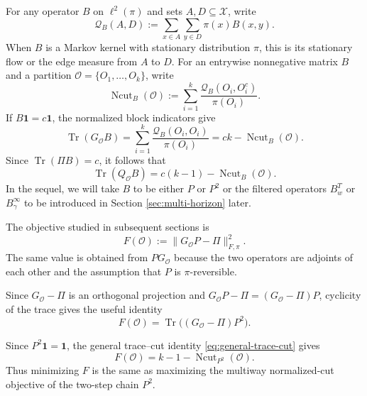 \documentclass[11pt]{article}
\newcommand{\1}{\mathbf{1}}
\newcommand{\X}{\mathcal{X}}
\begin{document}
For any operator $B$ on $\ell^2(\pi)$ and sets
$A,D\subseteq\X$, write
\begin{equation}
    \mathcal Q_B(A,D)
    :=\sum_{x\in A}\sum_{y\in D}\pi(x)B(x,y).
    \label{eq:general-flow}
\end{equation}
When $B$ is a Markov kernel with stationary distribution $\pi$, this
is its stationary flow or the edge measure from $A$ to $D$.  For an entrywise nonnegative matrix
$B$ and a partition
$\mathcal O=\{O_1,\ldots,O_k\}$, write
\begin{equation*}
    \operatorname{Ncut}_B(\mathcal O)
    :=\sum_{i=1}^k
      \frac{\mathcal Q_B(O_i,O_i^c)}{\pi(O_i)}.
\end{equation*}
If $B\1=c\1$, the normalized block indicators give
\[
    \operatorname{Tr}(G_{\mathcal O}B)
    =\sum_{i=1}^k
      \frac{\mathcal Q_B(O_i,O_i)}{\pi(O_i)}
    =ck-\operatorname{Ncut}_B(\mathcal O).
\]
Since $\operatorname{Tr}(\Pi B)=c$, it follows that
\begin{equation}
    \operatorname{Tr}(Q_{\mathcal O}B)
    =c(k-1)-\operatorname{Ncut}_B(\mathcal O).
    \label{eq:general-trace-cut}
\end{equation}
In the sequel, we will take $B$ to be either $P$ or $P^2$ or the
filtered operators $B_w^T$ or $B_\gamma^\infty$ to be introduced in Section \ref{sec:multi-horizon} later.

The objective studied in subsequent sections is
\begin{equation}
    F(\mathcal O)
    :=\|G_{\mathcal O}P-\Pi\|_{F,\pi}^2.
    \label{eq:F-definition}
\end{equation}
The same value is obtained from $PG_{\mathcal O}$ because the two
operators are adjoints of each other and the assumption that $P$ is $\pi$-reversible.

Since $G_{\mathcal O}-\Pi$ is an orthogonal projection and
$G_{\mathcal O}P-\Pi=(G_{\mathcal O}-\Pi)P$, cyclicity of the trace
gives the useful identity
\begin{equation}
    F(\mathcal O)
    =\operatorname{Tr}\bigl((G_{\mathcal O}-\Pi)P^2\bigr).
    \label{eq:F-trace}
\end{equation}

Since $P^2\1=\1$, the general trace--cut identity
\eqref{eq:general-trace-cut} gives
\begin{equation}
    F(\mathcal O)
    =k-1-\operatorname{Ncut}_{P^2}(\mathcal O).
    \label{eq:F-cut}
\end{equation}
Thus minimizing $F$ is the same as maximizing the multiway
normalized-cut objective of the two-step chain $P^2$.
\end{document}
